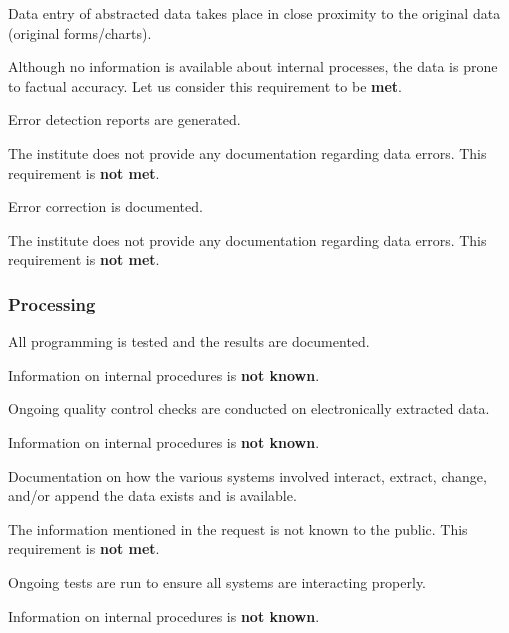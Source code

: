 \begin{QandA}
    \item Data entry of abstracted data takes place in close proximity to the original data (original forms/charts).
    \begin{answered}
        Although no information is available about internal processes, the data is prone to factual accuracy.
        Let us consider this requirement to be \textbf{met}.
    \end{answered}

    \item Error detection reports are generated.
    \begin{answered}
        The institute does not provide any documentation regarding data errors.
        This requirement is \textbf{not met}.
    \end{answered}

    \item Error correction is documented.
    \begin{answered}
        The institute does not provide any documentation regarding data errors.
        This requirement is \textbf{not met}.
    \end{answered}

\end{QandA}

\subsubsection{Processing}

\begin{QandA}
    \item All programming is tested and the results are documented.
    \begin{answered}
        Information on internal procedures is \textbf{not known}.
    \end{answered}

    \item Ongoing quality control checks are conducted on electronically extracted data.
    \begin{answered}
        Information on internal procedures is \textbf{not known}.
    \end{answered}

    \item Documentation on how the various systems involved interact, extract, change, and/or append the data exists and is available.
    \begin{answered}
        The information mentioned in the request is not known to the public.
        This requirement is \textbf{not met}.
    \end{answered}

    \item Ongoing tests are run to ensure all systems are interacting properly.
    \begin{answered}
        Information on internal procedures is \textbf{not known}.
    \end{answered}

\end{QandA}

